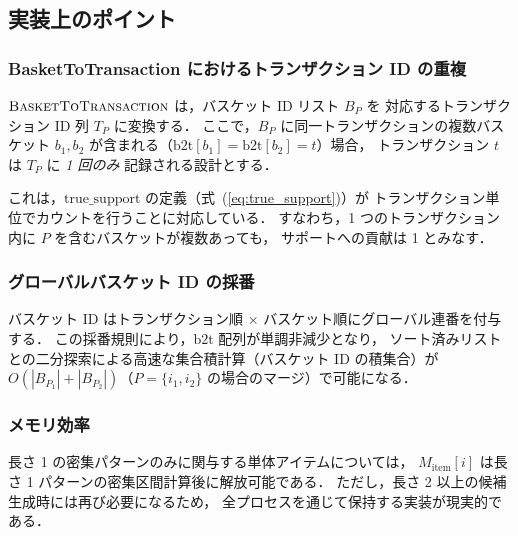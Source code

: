 \subsection{実装上のポイント}

\subsubsection{BasketToTransaction におけるトランザクション ID の重複}
$\Call{BasketToTransaction}{}$ は，バスケット ID リスト $B_P$ を
対応するトランザクション ID 列 $T_P$ に変換する．
ここで，$B_P$ に同一トランザクションの複数バスケット
$b_1, b_2$ が含まれる（$\text{b2t}[b_1] = \text{b2t}[b_2] = t$）場合，
トランザクション $t$ は $T_P$ に \emph{1 回のみ} 記録される設計とする．

これは，$\text{true\_support}$ の定義（式~(\ref{eq:true_support})）が
トランザクション単位でカウントを行うことに対応している．
すなわち，1 つのトランザクション内に $P$ を含むバスケットが複数あっても，
サポートへの貢献は 1 とみなす．

\subsubsection{グローバルバスケット ID の採番}
バスケット ID はトランザクション順 × バスケット順にグローバル連番を付与する．
この採番規則により，$\text{b2t}$ 配列が単調非減少となり，
ソート済みリストとの二分探索による高速な集合積計算（バスケット ID の積集合）が
$O(|B_{P_1}| + |B_{P_2}|)$（$P = \{i_1, i_2\}$ の場合のマージ）で可能になる．

\subsubsection{メモリ効率}
長さ 1 の密集パターンのみに関与する単体アイテムについては，
$M_{\text{item}}[i]$ は長さ 1 パターンの密集区間計算後に解放可能である．
ただし，長さ 2 以上の候補生成時には再び必要になるため，
全プロセスを通じて保持する実装が現実的である．
